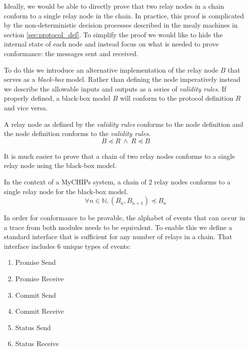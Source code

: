 \documentclass[runningheads]{llncs}
\begin{document}
Ideally, we would be able to directly prove that two relay nodes in a chain conform to a single relay node in the chain. In practice, this proof is complicated by the non-deterministic decision processes described in the mealy machines in section \ref{sec:protocol_def}. To simplify the proof we would like to hide the internal state of each node and instead focus on what is needed to prove conformance: the messages sent and received.

To do this we introduce an alternative implementation of the relay node $B$ that serves as a \emph{black-box} model. Rather than defining the node imperatively instead we describe the allowable inputs and outputs as a series of \emph{validity rules}. If properly defined, a black-box model $B$ will conform to the protocol definition $R$ and vice versa.

\begin{lemma}
\label{lemma:ind_cof_model}
A relay node as defined by the \emph{validity rules} conforms to the node definition and the node definition conforms to the \emph{validity rules}.
$$B \preceq R\ 
\wedge\ 
R \preceq B$$
\end{lemma}

It is much easier to prove that a chain of two relay nodes conforms to a single relay node using the black-box model. 

\begin{lemma}
\label{lemma:chain_conform}
In the context of a MyCHIPs system, a chain of 2 relay nodes conforms to a single relay node for the black-box model.
$$\forall n \in \mathds{N}, (B_n, B_{n+1}) \preceq B_n
$$
\end{lemma}

In order for conformance to be provable, the alphabet of events that can occur in a trace from both modules needs to be equivalent. To enable this we define a standard interface that is sufficient for any number of relays in a chain. That interface includes 6 unique types of events:
\begin{enumerate}
    \item Promise Send
    \item Promise Receive
    \item Commit Send
    \item Commit Receive
    \item Status Send
    \item Status Receive
\end{enumerate}
\end{document}
